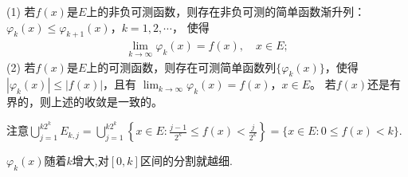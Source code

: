 \documentclass[../../main.tex]{subfiles}
\begin{document}
\begin{theorem}[简单函数逼近定理]\label{theorem:简单函数逼近定理}
(1) 若$f(x)$是$E$上的非负可测函数，则存在非负可测的简单函数渐升列：
$\varphi_k(x) \leqslant \varphi_{k + 1}(x)$，$k = 1, 2, \cdots$，
使得
\begin{align}
\lim_{k \to \infty} \varphi_k(x) = f(x), \quad x \in E; \label{eq:3.5}
\end{align}
(2) 若$f(x)$是$E$上的可测函数，则存在可测简单函数列$\{\varphi_k(x)\}$，使得$|\varphi_k(x)| \leqslant |f(x)|$，且有
$\lim_{k \to \infty} \varphi_k(x) = f(x)$，$x \in E$。
若$f(x)$还是有界的，则上述的收敛是一致的。
\end{theorem}
\begin{remark}
注意$\bigcup_{j=1}^{k2^k}E_{k, j}=\bigcup_{j=1}^{k2^k}\left\{x \in E: \frac{j - 1}{2^k} \leqslant f(x) < \frac{j}{2^k} \right\}=\{x\in E:0\leqslant f(x)<k\}.$
\end{remark}
\begin{note}
$\varphi_k(x)$随着$k$增大,对$[0,k]$区间的分割就越细.
\end{note}
\end{document}

